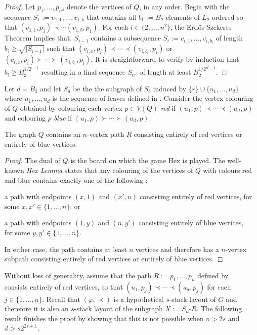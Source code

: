 \documentclass[kpfonts]{patmorin}
\renewcommand{\ge}{\geqslant}
\begin{document}
\begin{proof}
    Let $p_1,\ldots,p_{n^2}$ denote the vertices of $Q$, in any order.
    Begin with the sequence $S_1:=v_{1,1},\ldots,v_{1,b}$ that contains all $b_1:=B_2$ elements of $L_2$ ordered so that $(v_{1,1},p_1)\prec\cdots(v_{1,b},p_1)$.  For each $i\in\{2,\ldots,n^2\}$, the Erd\H{o}s-Szekeres Theorem implies that, $S_{i-1}$ contains a subsequence $S_i:=v_{i,1},\ldots,v_{i,b_i}$ of length $b_i\ge \sqrt{|S_{i-1}|}$ such that $(v_{i,1},p_i)\prec\cdots\prec(v_{i,b_i},p_i)$ or $(v_{i,1},p_i)\succ\cdots\succ(v_{i,b_i},p_i)$.  It is straightforward to verify by induction that $b_i \ge B_3^{1/2^{i-1}}$ resulting in a final sequence $S_{n^2}$ of length at least $B_2^{1/2^{n^2-1}}$.
\end{proof}

Let $d=B_3$ and let $S_d$ be the the subgraph of $S_b$ induced by $\{r\}\cup\{u_1,\ldots,u_{d}\}$ where $u_1,\ldots,u_d$ is the sequence of leaves defined in .  Consider the vertex colouring of $Q$ obtained by colouring each vertex $p\in V(Q)$ \emph{red} if $(u_1,p)\prec\cdots\prec (u_d,p)$ and colouring $p$ \emph{blue} if $(u_1,p)\succ\cdots\succ(u_d,p)$.

\begin{lem}
    The graph $Q$ contains an $n$-vertex path $R$ consisting entirely of red vertices or entirely of blue vertices.
\end{lem}

\begin{proof}
    The dual of $Q$ is the board on which the game Hex is played.  The well-known \emph{Hex Lemma} states that any colouring of the vertices of $Q$ with colours red and blue contains exactly one of the following \cite{Gale79}:
    \begin{compactenum}
        \item a path with endpoints $(x,1)$ and $(x',n)$ consisting entirely of red vertices, for some $x,x'\in\{1,\ldots,n\}$; or
        \item a path with endpoints $(1,y)$ and $(n,y')$ consisting entirely of blue vertices, for some $y,y'\in\{1,\ldots,n\}$.
    \end{compactenum}
    In either case, the path contains at least $n$ vertices and therefore has a $n$-vertex subpath consisting entirely of red vertices or entirely of blue vertices.
\end{proof}

Without loss of generality, assume that the path $R:=p_1,\ldots,p_n$ defined by  consists entirely of red vertices, so that $(u_1,p_j)\prec\cdots\prec (u_d,p_j)$ for each $j\in\{1,\ldots,n\}$.
Recall that $(\varphi,\prec)$ is a hypothetical $s$-stack layout of $G$ and therefore it is also an $s$-stack layout of the subgraph $X:=S_d\square R$.  The following result finishes the proof by showing that this is not possible when $n> 2s$ and $d> s2^{2s+1}$.
\end{document}
